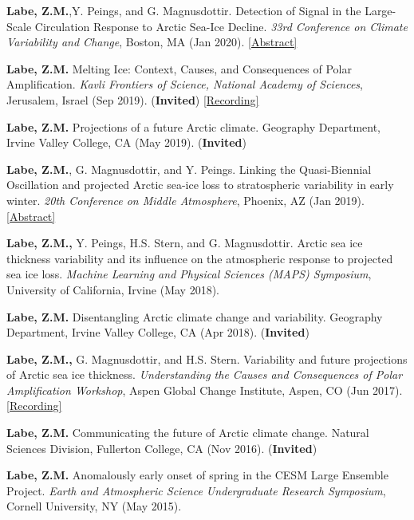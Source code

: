 \documentclass[margin,line,palatino,courier,10pt]{res}
\begin{document}
\begin{resume}
\begin{etaremune}[leftmargin=0in,topsep=0in,parsep=0in]
\item \textbf{Labe, Z.M.},Y. Peings, and G. Magnusdottir. Detection of Signal in the Large-Scale Circulation Response to Arctic Sea-Ice Decline. \textit{33rd Conference on Climate Variability and Change}, Boston, MA (Jan 2020). \href{https://ams.confex.com/ams/2020Annual/meetingapp.cgi/Paper/367289}{[Abstract]}
\item \textbf{Labe, Z.M.} Melting Ice: Context, Causes, and Consequences of Polar Amplification. \textit{Kavli Frontiers of Science, National Academy of Sciences}, Jerusalem, Israel (Sep 2019). (\textbf{Invited}) \href{https://vimeo.com/362912204}{[Recording]}
\item \textbf{Labe, Z.M.} Projections of a future Arctic climate. Geography Department, Irvine Valley College, CA (May 2019). (\textbf{Invited})
\item \textbf{Labe, Z.M.}, G. Magnusdottir, and Y. Peings. Linking the Quasi-Biennial Oscillation and projected Arctic sea-ice loss to stratospheric variability in early winter. \textit{20th Conference on Middle Atmosphere}, Phoenix, AZ (Jan 2019). \href{https://ams.confex.com/ams/2019Annual/meetingapp.cgi/Paper/352664}{[Abstract]}
\item \textbf{Labe, Z.M.,} Y. Peings, H.S. Stern, and G. Magnusdottir. Arctic sea ice thickness variability and its influence on the atmospheric response to projected sea ice loss. \textit{Machine Learning and Physical Sciences (MAPS) Symposium}, University of California, Irvine (May 2018). 
\item \textbf{Labe, Z.M.} Disentangling Arctic climate change and variability. Geography Department, Irvine Valley College, CA (Apr 2018). (\textbf{Invited})
\item \textbf{Labe, Z.M.,} G. Magnusdottir, and H.S. Stern. Variability and future projections of Arctic sea ice thickness. \textit{Understanding the Causes and Consequences of Polar Amplification Workshop}, Aspen Global Change Institute, Aspen, CO (Jun 2017). \href{https://www.agci.org/lib/17s1/variability-and-future-projections-arctic-sea-ice-thickness}{[Recording]}
\item \textbf{Labe, Z.M.} Communicating the future of Arctic climate change. Natural Sciences Division, Fullerton College, CA (Nov 2016). (\textbf{Invited})
\item \textbf{Labe, Z.M.} Anomalously early onset of spring in the CESM Large Ensemble Project. \textit{Earth and Atmospheric Science Undergraduate Research Symposium}, Cornell University, NY (May 2015). 


\end{etaremune}
\end{resume}
\end{document}
